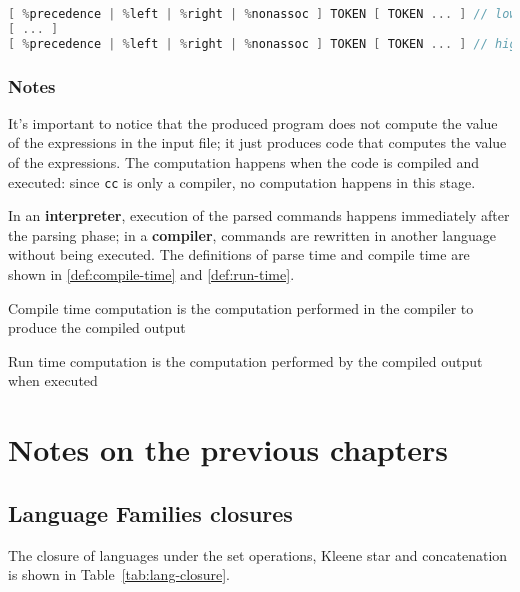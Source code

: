 \documentclass[english]{article}
\begin{document}
\begin{lstlisting}[language=C, morekeywords={precedence, left, right, nonassoc}, caption={Precedence and Associativity declaration}, label={lst:bison-precedence-associativity-declaration}]
[ %precedence | %left | %right | %nonassoc ] TOKEN [ TOKEN ... ] // lowest
[ ... ]
[ %precedence | %left | %right | %nonassoc ] TOKEN [ TOKEN ... ] // highest
\end{lstlisting}

\subsubsection{Notes}

It's important to notice that the produced program does not compute the value of the expressions in the input file;
it just produces \clang code that computes the value of the expressions.
The computation happens when the \clang code is compiled and executed:
since \texttt{cc} is only a compiler, no computation happens in this stage.

In an \textbf{interpreter}, execution of the  parsed commands happens immediately after the parsing phase;
in a \textbf{compiler}, commands are rewritten in another language without being executed.
The definitions of parse time and compile time are shown in \ref{def:compile-time} and \ref{def:run-time}.

\begin{definition}
  \label{def:compile-time}
  Compile time computation is the computation performed in the compiler to produce the compiled output
\end{definition}

\begin{definition}
  \label{def:run-time}
  Run time computation is the computation performed by the compiled output when executed
\end{definition}

\clearpage

\section{Notes on the previous chapters}

\subsection{Language Families closures}

The closure of languages under the set operations, Kleene star and concatenation is shown in Table~\ref{tab:lang-closure}.
\end{document}
